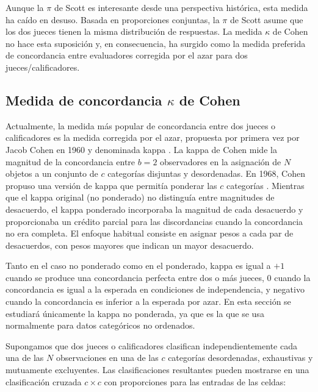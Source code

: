 \documentclass[12pt,a4paper,]{book}
\numberwithin{dummy}{section}
\theoremstyle{ocrenumbox}
\theoremstyle{blacknumex}
\theoremstyle{blacknumbox}
\theoremstyle{ocrenum}
\theoremstyle{ocrenum}
\begin{document}
Aunque la \(\pi\) de Scott es interesante desde una perspectiva
histórica, esta medida ha caído en desuso. Basada en proporciones
conjuntas, la \(\pi\) de Scott asume que los dos jueces tienen la misma
distribución de respuestas. La medida \(\kappa\) de Cohen no hace esta
suposición y, en consecuencia, ha surgido como la medida preferida de
concordancia entre evaluadores corregida por el azar para dos
jueces/calificadores.

\hypertarget{medida-de-concordancia-kappa-de-cohen}{%
\subsection{\texorpdfstring{Medida de concordancia \(\kappa\) de
Cohen}{Medida de concordancia \textbackslash kappa de Cohen}}\label{medida-de-concordancia-kappa-de-cohen}}

Actualmente, la medida más popular de concordancia entre dos jueces o
calificadores es la medida corregida por el azar, propuesta por primera
vez por Jacob Cohen en 1960 y denominada kappa \citep{Cohen1960}. La
kappa de Cohen mide la magnitud de la concordancia entre \(b = 2\)
observadores en la asignación de \(N\) objetos a un conjunto de \(c\)
categorías disjuntas y desordenadas. En 1968, Cohen propuso una versión
de kappa que permitía ponderar las \(c\) categorías \citep{Cohen1968}.
Mientras que el kappa original (no ponderado) no distinguía entre
magnitudes de desacuerdo, el kappa ponderado incorporaba la magnitud de
cada desacuerdo y proporcionaba un crédito parcial para las
discordancias cuando la concordancia no era completa. El enfoque
habitual consiste en asignar pesos a cada par de desacuerdos, con pesos
mayores que indican un mayor desacuerdo.

Tanto en el caso no ponderado como en el ponderado, kappa es igual a
\(+1\) cuando se produce una concordancia perfecta entre dos o más
jueces, \(0\) cuando la concordancia es igual a la esperada en
condiciones de independencia, y negativo cuando la concordancia es
inferior a la esperada por azar. En esta sección se estudiará únicamente
la kappa no ponderada, ya que es la que se usa normalmente para datos
categóricos no ordenados.

Supongamos que dos jueces o calificadores clasifican independientemente
cada una de las \(N\) observaciones en una de las \(c\) categorías
desordenadas, exhaustivas y mutuamente excluyentes. Las clasificaciones
resultantes pueden mostrarse en una clasificación cruzada \(c\times c\)
con proporciones para las entradas de las celdas:
\end{document}
